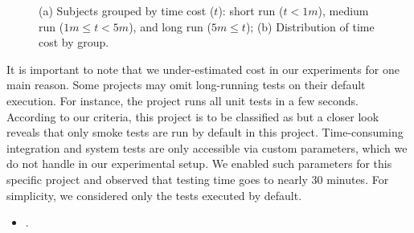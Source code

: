 \begin{figure}[ht]
\begin{subfigure}{0.25\textwidth}
        \caption{\label{fig:rq1-boxplot}}
    \end{subfigure}%
    \caption{(a) Subjects grouped by time cost ($t$): short run ($t <
    1m$), medium run ($1m \le t < 5m$), and long run ($5m \le t$); (b)
    Distribution of time cost by group.}
\end{figure}


It is important to note that we under-estimated cost in our
experiments for one main reason.
Some projects may omit long-running tests on their default
execution. For instance, the project 
runs all unit tests in a few seconds.  According to our criteria, this
project is to be classified as \shortg{} but a closer look reveals
that only smoke tests are run by default in this project.
Time-consuming integration and system tests are only accessible via
custom parameters, which we do not handle in our experimental setup.
We enabled such parameters for this specific project and observed that
testing time goes to nearly 30 minutes.  For simplicity, we considered
only the tests executed by default.
\vspace{1ex}
\begin{center}
\end{center}
\vspace{1ex}


\begin{itemize}
    \item \numRQFeasibilityTwo. \textbf{\RQFeasibilityTwo}
\end{itemize}

